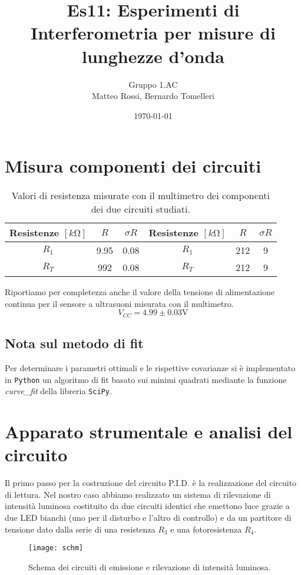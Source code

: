 \documentclass[10pt, a4paper, italian]{article}
\author{Gruppo 1.AC \\ Matteo Rossi, Bernardo Tomelleri}
\title{Es11: Esperimenti di Interferometria per misure di lunghezze d'onda}
\begin{document}
\date{\today}
\maketitle

\setcounter{section}{0}

\section*{Misura componenti dei circuiti}
\begin{table}[htbp]
\centering
\begin{tabular}{ccc|ccc}
\toprule
Resistenze $[\si{k\ohm}]$ & $R$ & $\sigma R$ & Resistenze $[\si{k\ohm}]$ & $R$ &
$\sigma R$ \\
\midrule
\midrule
$R_1$	  	& 9.95 	& 0.08		& $R_1$ & 212	& 9 \\
$R_T$	  	& 992	& 0.08		& $R_T$ & 212	& 9 \\
\bottomrule
\end{tabular}
\caption{Valori di resistenza misurate con il multimetro dei componenti dei
due circuiti studiati. \label{tab: rcmes_B}}
\end{table}

Riportiamo per completezza anche il valore della tensione di alimentazione
continua per il sensore a ultrasuoni misurata con il multimetro.
\[
V_{CC} = 4.99 \pm 0.03 \si{\V}
\]

\subsection*{Nota sul metodo di fit}
Per determinare i parametri ottimali e le rispettive covarianze si \`e
implementato in \verb+Python+ un algoritmo di fit basato sui minimi quadrati
mediante la funzione \emph{curve\_fit} della libreria \texttt{SciPy}.

\section{Apparato strumentale e analisi del circuito}
Il primo passo per la costruzione del circuito P.I.D. è la realizzazione del
circuito di lettura. Nel nostro caso abbiamo realizzato un sistema di
rilevazione di intensità luminosa costituito da due circuiti identici che
emettono luce grazie a due LED bianchi (uno per il disturbo e l'altro di
controllo) e da un partitore di tensione dato dalla serie di una resistenza
$R_3$ e una fotoresistenza $R_4$.

\begin{figure}[htbp]
    \centering
	\texttt{[image: schm]}
    \caption{Schema dei circuiti di emissione e rilevazione di intensità
    luminosa.
    \label{schm: mesctrl}}
\end{figure}
\end{document}
